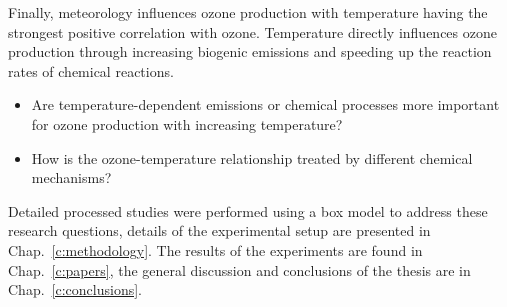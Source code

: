 Finally, meteorology influences ozone production with temperature having the strongest positive correlation with ozone.
Temperature directly influences ozone production through increasing biogenic emissions and speeding up the reaction rates of chemical reactions.
\newpage
\begin{itemize}
    \item Are temperature-dependent emissions or chemical processes more important for ozone production with increasing temperature? 
    \item How is the ozone-temperature relationship treated by different chemical mechanisms?
\end{itemize}

Detailed processed studies were performed using a box model to address these research questions, details of the experimental setup are presented in Chap.~\ref{c:methodology}.
The results of the experiments are found in Chap.~\ref{c:papers}, the general discussion and conclusions of the thesis are in Chap.~\ref{c:conclusions}.
